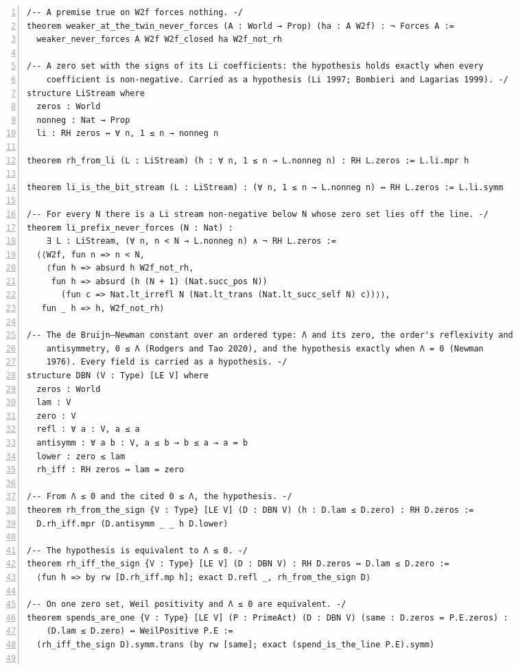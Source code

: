 \documentclass[10pt]{article}
\newcommand{\leansize}{\fontsize{5.5pt}{6.75pt}\selectfont}
\begin{document}
\begin{multicols}{2}
\begin{Verbatim}[numbers=left,firstnumber=1,numbersep=3pt,xleftmargin=2.6em,breaklines=true,breakanywhere=true,breakautoindent=false,breakindent=1.4em,breaksymbolleft={},breakanywheresymbolpre={},fontsize=\leansize]
/-- A premise true on W2f forces nothing. -/
theorem weaker_at_the_twin_never_forces (A : World → Prop) (ha : A W2f) : ¬ Forces A :=
  weaker_never_forces A W2f W2f_closed ha W2f_not_rh

/-- A zero set with the signs of its Li coefficients: the hypothesis holds exactly when every
    coefficient is non-negative. Carried as a hypothesis (Li 1997; Bombieri and Lagarias 1999). -/
structure LiStream where
  zeros : World
  nonneg : Nat → Prop
  li : RH zeros ↔ ∀ n, 1 ≤ n → nonneg n

theorem rh_from_li (L : LiStream) (h : ∀ n, 1 ≤ n → L.nonneg n) : RH L.zeros := L.li.mpr h

theorem li_is_the_bit_stream (L : LiStream) : (∀ n, 1 ≤ n → L.nonneg n) ↔ RH L.zeros := L.li.symm

/-- For every N there is a Li stream non-negative below N whose zero set lies off the line. -/
theorem li_prefix_never_forces (N : Nat) :
    ∃ L : LiStream, (∀ n, n < N → L.nonneg n) ∧ ¬ RH L.zeros :=
  ⟨⟨W2f, fun n => n < N,
    ⟨fun h => absurd h W2f_not_rh,
     fun h => absurd (h (N + 1) (Nat.succ_pos N))
       (fun c => Nat.lt_irrefl N (Nat.lt_trans (Nat.lt_succ_self N) c))⟩⟩,
   fun _ h => h, W2f_not_rh⟩

/-- The de Bruijn–Newman constant over an ordered type: Λ and its zero, the order's reflexivity and
    antisymmetry, 0 ≤ Λ (Rodgers and Tao 2020), and the hypothesis exactly when Λ = 0 (Newman
    1976). Every field is carried as a hypothesis. -/
structure DBN (V : Type) [LE V] where
  zeros : World
  lam : V
  zero : V
  refl : ∀ a : V, a ≤ a
  antisymm : ∀ a b : V, a ≤ b → b ≤ a → a = b
  lower : zero ≤ lam
  rh_iff : RH zeros ↔ lam = zero

/-- From Λ ≤ 0 and the cited 0 ≤ Λ, the hypothesis. -/
theorem rh_from_the_sign {V : Type} [LE V] (D : DBN V) (h : D.lam ≤ D.zero) : RH D.zeros :=
  D.rh_iff.mpr (D.antisymm _ _ h D.lower)

/-- The hypothesis is equivalent to Λ ≤ 0. -/
theorem rh_iff_the_sign {V : Type} [LE V] (D : DBN V) : RH D.zeros ↔ D.lam ≤ D.zero :=
  ⟨fun h => by rw [D.rh_iff.mp h]; exact D.refl _, rh_from_the_sign D⟩

/-- On one zero set, Weil positivity and Λ ≤ 0 are equivalent. -/
theorem spends_are_one {V : Type} [LE V] (P : PrimeAct) (D : DBN V) (same : D.zeros = P.E.zeros) :
    (D.lam ≤ D.zero) ↔ WeilPositive P.E :=
  (rh_iff_the_sign D).symm.trans (by rw [same]; exact (spend_is_the_line P.E).symm)


\end{Verbatim}
\end{multicols}
\end{document}
